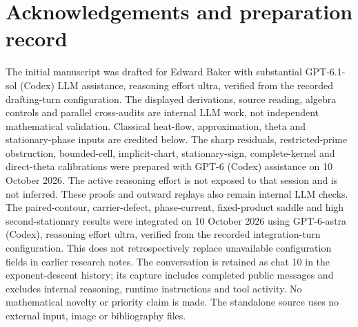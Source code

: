 \documentclass[11pt]{article}
\theoremstyle{definition}
\theoremstyle{remark}
\begin{document}
\section*{Acknowledgements and preparation record}

The initial manuscript was drafted for Edward Baker with substantial
GPT-6.1-sol (Codex) LLM assistance, reasoning effort ultra, verified from
the recorded drafting-turn configuration. The displayed derivations,
source reading, algebra controls and parallel cross-audits are internal
LLM work, not independent mathematical validation. Classical heat-flow,
approximation, theta and stationary-phase inputs are credited below.
The sharp residuals, restricted-prime obstruction, bounded-cell,
implicit-chart, stationary-sign, complete-kernel and direct-theta
calibrations were prepared with
GPT-6 (Codex) assistance on 10 October
2026. The active reasoning effort is not exposed to that session and is
not inferred. These proofs and outward replays also remain internal LLM
checks. The paired-contour, carrier-defect, phase-current, fixed-product
saddle and high second-stationary results were integrated on 10 October
2026 using GPT-6-astra (Codex), reasoning effort ultra, verified from the
recorded integration-turn configuration. This does not retrospectively
replace unavailable configuration fields in earlier research notes.
The conversation is retained as chat 10 in the exponent-descent history;
its capture includes completed public messages and excludes internal
reasoning, runtime instructions and tool activity.
No mathematical novelty or priority claim is made. The standalone source
uses no external input, image or bibliography files.
\end{document}
